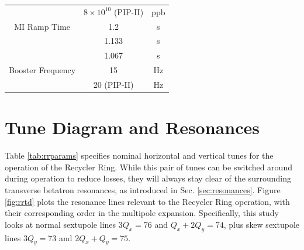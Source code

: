 \begin{table}[H]
\begin{tabular}{@{}ccc@{}}
                               & $8\times10^{10}$ (PIP-II)                  & ppb           \\
   MI Ramp Time                & 1.2                                        & s             \\
                               & 1.133                                      & s             \\
                               & 1.067                                      & s             \\
   Booster Frequency           & 15                                         & Hz            \\
                               & 20 (PIP-II)                                & Hz            \\ \bottomrule
   \end{tabular}
   \end{table}

\section{Tune Diagram and Resonances}

Table \ref{tab:rrparams} specifies nominal horizontal and vertical tunes for the operation of the Recycler Ring. While this pair of tunes can be switched around during operation to reduce losses, they will always stay clear of the surrounding transverse betatron resonances, as introduced in Sec. \ref{sec:resonances}. Figure \ref{fig:rrtd} plots the resonance lines relevant to the Recycler Ring operation, with their corresponding order in the multipole expansion. Specifically, this study looks at normal sextupole lines $3 Q_x=76$ and $Q_x+2Q_y=74$, plus skew sextupole lines $3 Q_y=73$ and $2 Q_x+Q_y=75$.

